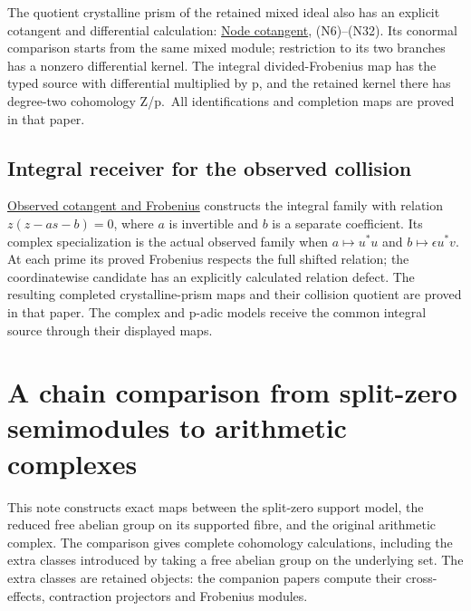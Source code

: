 \documentclass[
]{article}
\begin{document}
The quotient crystalline prism of the retained mixed ideal also has an
explicit cotangent and differential calculation:
\href{https://github.com/KokunoYumeto/zeta-function-research-reader/blob/6af54ea3c8ef99127af327f3103e086c68d482c2/workbenches/splitzero-tandem/branches/identity-absorber-square/NODE_COTANGENT.md}{Node
cotangent}, (N6)--(N32). Its conormal comparison starts from the same
mixed module; restriction to its two branches has a nonzero differential
kernel. The integral divided-Frobenius map has the typed source with
differential multiplied by p, and the retained kernel there has
degree-two cohomology Z/p.~All identifications and completion maps are
proved in that paper.

\subsection{Integral receiver for the observed
collision}\label{integral-receiver-for-the-observed-collision}

\href{https://github.com/KokunoYumeto/zeta-function-research-reader/blob/c9df443d9e1df000dfbb083943f97197e746eb08/workbenches/splitzero-tandem/branches/identity-absorber-square/OBSERVED_COTANGENT_FROBENIUS.md}{Observed
cotangent and Frobenius} constructs the integral family with relation
\(z(z-as-b)=0\), where \(a\) is invertible and \(b\) is a separate
coefficient. Its complex specialization is the actual observed family
when \(a\mapsto u^*u\) and \(b\mapsto\epsilon u^*v\). At each prime its
proved Frobenius respects the full shifted relation; the coordinatewise
candidate has an explicitly calculated relation defect. The resulting
completed crystalline-prism maps and their collision quotient are proved
in that paper. The complex and p-adic models receive the common integral
source through their displayed maps.

\section{A chain comparison from split-zero semimodules to arithmetic
complexes}\label{a-chain-comparison-from-split-zero-semimodules-to-arithmetic-complexes}

This note constructs exact maps between the split-zero support model,
the reduced free abelian group on its supported fibre, and the original
arithmetic complex. The comparison gives complete cohomology
calculations, including the extra classes introduced by taking a free
abelian group on the underlying set. The extra classes are retained
objects: the companion papers compute their cross-effects, contraction
projectors and Frobenius modules.
\end{document}
